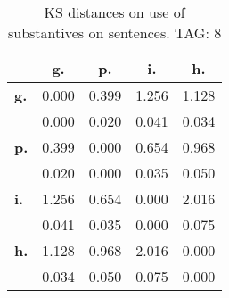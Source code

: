 \begin{table}[h!]
\begin{center}
\begin{tabular}{| l || c | c | c | c |}\hline
 & {\bf g.} & {\bf p.} & {\bf i.} & {\bf h.} \\\hline\hline
{\bf g.} & 0.000 & 0.399 & 1.256 & 1.128 \\
{\bf } & 0.000 & 0.020 & 0.041 & 0.034 \\\hline
{\bf p.} & 0.399 & 0.000 & 0.654 & 0.968 \\
{\bf } & 0.020 & 0.000 & 0.035 & 0.050 \\\hline
{\bf i.} & 1.256 & 0.654 & 0.000 & 2.016 \\
{\bf } & 0.041 & 0.035 & 0.000 & 0.075 \\\hline
{\bf h.} & 1.128 & 0.968 & 2.016 & 0.000 \\
{\bf } & 0.034 & 0.050 & 0.075 & 0.000 \\\hline
\end{tabular}
\caption{KS distances on use of substantives on sentences. TAG: 8}
\end{center}
\end{table}